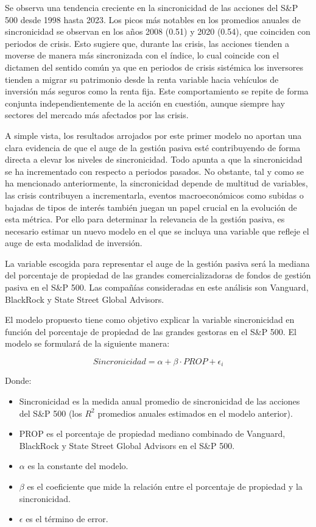 \documentclass[12pt,a4paper]{article}
\begin{document}
Se observa una tendencia creciente en la sincronicidad de las acciones del S\&P 500 desde 1998 hasta 2023. Los picos más notables en los promedios anuales de sincronicidad se observan en los años 2008 (0.51) y 2020 (0.54), que coinciden con periodos de crisis. Esto sugiere que, durante las crisis, las acciones tienden a moverse de manera más sincronizada con el índice, lo cual coincide con el dictamen del sentido común ya que en periodos de crisis sistémica los inversores tienden a migrar su patrimonio desde la renta variable hacia vehículos de inversión más seguros como la renta fija. Este comportamiento se repite de forma conjunta independientemente de la acción en cuestión, aunque siempre hay sectores del mercado más afectados por las crisis.

A simple vista, los resultados arrojados por este primer modelo no aportan una clara evidencia de que el auge de la gestión pasiva esté contribuyendo de forma directa a elevar los niveles de sincronicidad. Todo apunta a que la sincronicidad se ha incrementado con respecto a periodos pasados. No obstante, tal y como se ha mencionado anteriormente, la sincronicidad depende de multitud de variables, las crisis contribuyen a incrementarla, eventos macroeconómicos como subidas o bajadas de tipos de interés también juegan un papel crucial en la evolución de esta métrica. Por ello para determinar la relevancia de la gestión pasiva, es necesario estimar un nuevo modelo en el que se incluya una variable que refleje el auge de esta modalidad de inversión.

La variable escogida para representar el auge de la gestión pasiva será la mediana del porcentaje de propiedad de las grandes comercializadoras de fondos de gestión pasiva en el S\&P 500. Las compañías consideradas en este análisis son Vanguard, BlackRock y State Street Global Advisors.

El modelo propuesto tiene como objetivo explicar la variable sincronicidad en función del porcentaje de propiedad de las grandes gestoras en el S\&P 500. El modelo se formulará de la siguiente manera:

\begin{equation}
Sincronicidad = \alpha + \beta \cdot PROP + \epsilon_i
\end{equation}

Donde:
\begin{itemize}
\item Sincronicidad es la medida anual promedio de sincronicidad de las acciones del S\&P 500 (los $R^2$ promedios anuales estimados en el modelo anterior).
\item PROP es el porcentaje de propiedad mediano combinado de Vanguard, BlackRock y State Street Global Advisors en el S\&P 500.
\item $\alpha$ es la constante del modelo.
\item $\beta$ es el coeficiente que mide la relación entre el porcentaje de propiedad y la sincronicidad.
\item $\epsilon$ es el término de error.
\end{itemize}
\end{document}
